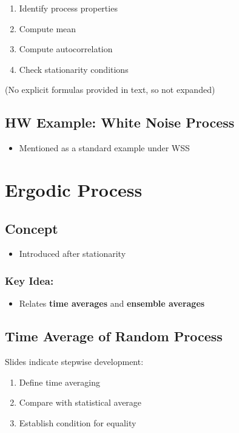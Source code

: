 \documentclass[12pt]{article}
\begin{document}
\begin{enumerate}
    \item Identify process properties
    \item Compute mean
    \item Compute autocorrelation
    \item Check stationarity conditions
\end{enumerate}

(No explicit formulas provided in text, so not expanded)

\subsection{HW Example: White Noise Process}

\begin{itemize}
    \item Mentioned as a standard example under WSS
\end{itemize}

\section{Ergodic Process}

\subsection{Concept}

\begin{itemize}
    \item Introduced after stationarity
\end{itemize}

\subsubsection*{Key Idea:}

\begin{itemize}
    \item Relates \textbf{time averages} and \textbf{ensemble averages}
\end{itemize}

\subsection{Time Average of Random Process}

Slides indicate stepwise development:

\begin{enumerate}
    \item Define time averaging
    \item Compare with statistical average
    \item Establish condition for equality
\end{enumerate}
\end{document}
